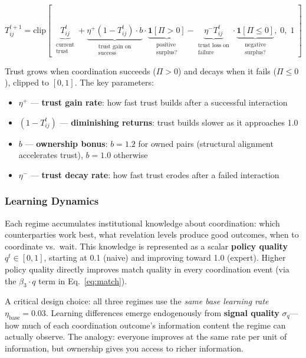\documentclass[12pt]{article}
\theoremstyle{definition}
\begin{document}
\begin{equation}
T_{ij}^{t+1} = \text{clip}\!\left[\;
\underbrace{T_{ij}^t}_{\substack{\text{current} \\ \text{trust}}}
+ \underbrace{\eta^+ (1 - T_{ij}^t) \cdot b}_{\substack{\text{trust gain on} \\ \text{success}}} \cdot \underbrace{\mathbf{1}[\Pi > 0]}_{\substack{\text{positive} \\ \text{surplus?}}}
- \underbrace{\eta^- T_{ij}^t}_{\substack{\text{trust loss on} \\ \text{failure}}} \cdot \underbrace{\mathbf{1}[\Pi \leq 0]}_{\substack{\text{negative} \\ \text{surplus?}}}
,\; 0,\; 1\;\right]
\end{equation}

\noindent Trust grows when coordination succeeds ($\Pi > 0$) and decays when it fails ($\Pi \leq 0$), clipped to $[0,1]$. The key parameters:
\begin{itemize}[leftmargin=*]
\item $\eta^+$ --- \textbf{trust gain rate}: how fast trust builds after a successful interaction
\item $(1 - T_{ij}^t)$ --- \textbf{diminishing returns}: trust builds slower as it approaches 1.0
\item $b$ --- \textbf{ownership bonus}: $b = 1.2$ for owned pairs (structural alignment accelerates trust), $b = 1.0$ otherwise
\item $\eta^-$ --- \textbf{trust decay rate}: how fast trust erodes after a failed interaction
\end{itemize}

\subsubsection{Learning Dynamics}
\label{sec:learning}

Each regime accumulates institutional knowledge about coordination: which counterparties work best, what revelation levels produce good outcomes, when to coordinate vs.\ wait. This knowledge is represented as a scalar \textbf{policy quality} $q^t \in [0,1]$, starting at 0.1 (naive) and improving toward 1.0 (expert). Higher policy quality directly improves match quality in every coordination event (via the $\beta_3 \cdot q$ term in Eq.~\ref{eq:match}).

A critical design choice: all three regimes use the \textit{same base learning rate} $\eta_{\text{base}} = 0.03$. Learning differences emerge endogenously from \textbf{signal quality} $\sigma_q$---how much of each coordination outcome's information content the regime can actually observe. The analogy: everyone improves at the same rate per unit of information, but ownership gives you access to richer information.
\end{document}
